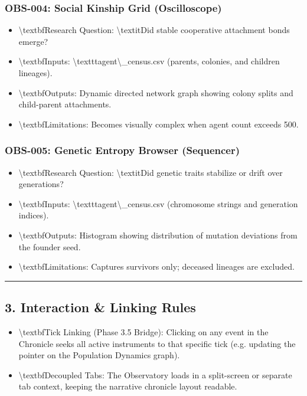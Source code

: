 \documentclass[11pt,a4paper]{article}
\begin{document}
\subsubsection*{OBS-004: Social Kinship Grid (Oscilloscope)}
\begin{itemize}
  \item \textbackslash{}textbf{Research Question}: \textbackslash{}textit{Did stable cooperative attachment bonds emerge?}
  \item \textbackslash{}textbf{Inputs}: \textbackslash{}texttt{agent\textbackslash{}\_census.csv} (parents, colonies, and children lineages).
  \item \textbackslash{}textbf{Outputs}: Dynamic directed network graph showing colony splits and child-parent attachments.
  \item \textbackslash{}textbf{Limitations}: Becomes visually complex when agent count exceeds 500.
\end{itemize}

\subsubsection*{OBS-005: Genetic Entropy Browser (Sequencer)}
\begin{itemize}
  \item \textbackslash{}textbf{Research Question}: \textbackslash{}textit{Did genetic traits stabilize or drift over generations?}
  \item \textbackslash{}textbf{Inputs}: \textbackslash{}texttt{agent\textbackslash{}\_census.csv} (chromosome strings and generation indices).
  \item \textbackslash{}textbf{Outputs}: Histogram showing distribution of mutation deviations from the founder seed.
  \item \textbackslash{}textbf{Limitations}: Captures survivors only; deceased lineages are excluded.
\end{itemize}

\noindent\rule{\textwidth}{0.4pt}

\subsection*{3. Interaction \& Linking Rules}

\begin{itemize}
  \item \textbackslash{}textbf{Tick Linking (Phase 3.5 Bridge)}: Clicking on any event in the Chronicle seeks all active instruments to that specific tick (e.g. updating the pointer on the Population Dynamics graph).
  \item \textbackslash{}textbf{Decoupled Tabs}: The Observatory loads in a split-screen or separate tab context, keeping the narrative chronicle layout readable.
\end{itemize}
\end{document}

